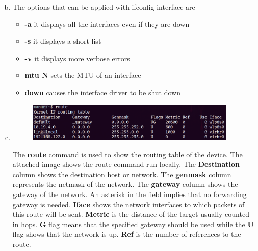 \documentclass[a4paper,10pt]{article}
\newlength{\strutheight}
\begin{document}
\begin{enumerate}[a)]
\begin{adjustbox}{valign=T,raise=\strutheight,minipage={\linewidth}}
	\end{adjustbox} 	
	\item 
	The options that can be applied with ifconfig interface are -
	\begin{itemize}
		\vspace{-0.25cm} \item \textbf{-a} it displays all the interfaces even if they are down
		\vspace{-0.2cm} \item \textbf{-s} it displays a short list
		\vspace{-0.2cm}\item \textbf{-v} it displays more verbose errors
		\vspace{-0.2cm}\item \textbf{mtu N} sets the MTU of an interface
		\vspace{-0.2cm}\item \textbf{down} causes the interface driver to be shut down
	\end{itemize}
	\item 
	\begin{adjustbox}{valign=T,raise=\strutheight,minipage={\linewidth}}
		\begin{figure}
			\includegraphics[width=10cm]{route1.png}
		\end{figure}
		\strut{}
		The \textbf{route} command is used to show the routing table of the device. The attached image shows the route command run locally. The \textbf{Destination} column shows the destination host or network. The \textbf{genmask} column represents the netmask of the network. The \textbf{gateway} column shows the gateway of the network. An asterisk in the field implies that no forwarding gateway is needed. \textbf{Iface} shows the network interfaces to which packets of this route will be sent. \textbf{Metric} is the distance of the target usually counted in hops. \textbf{G} flag means that the specified gateway should be used while the \textbf{U} flag shows that the network is up. \textbf{Ref} is the number of references to the route.
	\end{adjustbox} 
	

\end{enumerate}
\end{document}
